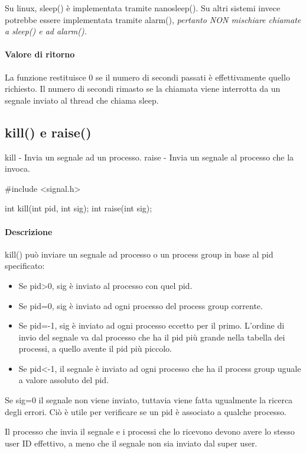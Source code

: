 \documentclass
[10pt,        %
 a4paper,     %
 onecolumn,   %
 fleqn,       %
 oneside,     %
 notitlepage, %
]{article}    %
\begin{document}
Su linux, sleep() è implementata tramite nanosleep(). Su altri sistemi invece potrebbe essere implementata tramite alarm(), \textit{pertanto NON mischiare chiamate a sleep() e ad alarm().}

\paragraph{Valore di ritorno}
La funzione restituisce 0 se il numero di secondi passati è effettivamente quello richiesto. Il numero di secondi rimasto se la chiamata viene interrotta da un segnale inviato al thread che chiama sleep. 

\subsection{kill() e raise()}
kill - Invia un segnale ad un processo.
raise - Invia un segnale al processo che la invoca.
\begin{C}
#include <signal.h>

int kill(int pid, int sig);
int raise(int sig);
\end{C}

\paragraph{Descrizione}
kill() può inviare un segnale ad processo o un process group in base al pid specificato:

\begin{itemize}
    \item Se pid>0, sig è inviato al processo con quel pid.
    \item Se pid=0, sig è inviato ad ogni processo del process group corrente.
    \item Se pid=-1, sig è inviato ad ogni processo eccetto per il primo. L'ordine di invio del segnale va dal processo che ha il pid più grande nella tabella dei processi, a quello avente il pid più piccolo.
    \item Se pid<-1, il segnale è inviato ad ogni processo che ha il process group uguale a valore assoluto del pid.
\end{itemize}

Se sig=0 il segnale non viene inviato, tuttavia viene fatta ugualmente la ricerca degli errori. Ciò è utile per verificare se un pid è associato a qualche processo.

Il processo che invia il segnale e i processi che lo ricevono devono avere lo stesso user ID effettivo, a meno che il segnale non sia inviato dal super user.
\end{document}
